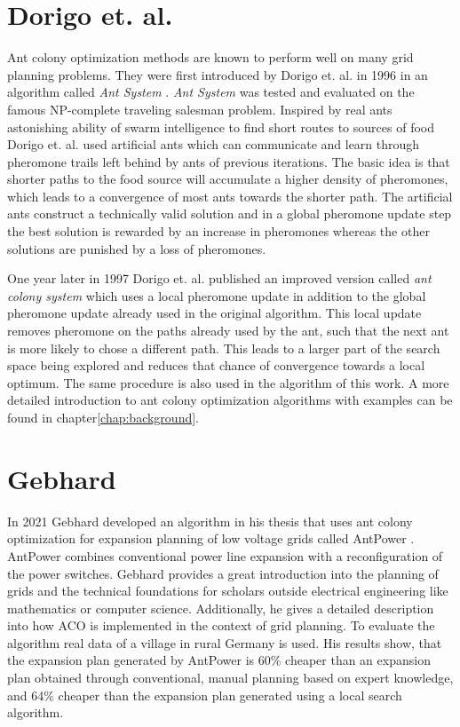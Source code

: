 \section{Dorigo et. al.}
Ant colony optimization methods are known to perform well on many grid planning problems. They were first introduced by Dorigo et. al. in 1996 in an algorithm called \textit{Ant System} \cite{ant_system}. \textit{Ant System} was tested and evaluated on the famous NP-complete traveling salesman problem. Inspired by real ants astonishing ability of swarm intelligence to find short routes to sources of food Dorigo et. al. used artificial ants which can communicate and learn through pheromone trails left behind by ants of previous iterations.
The basic idea is that shorter paths to the food source will accumulate a higher density of pheromones, which leads to a convergence of most ants towards the shorter path. The artificial ants construct a technically valid solution and in a global pheromone update step the best solution is rewarded by an increase in pheromones whereas the other solutions are punished by a loss of pheromones.

One year later in 1997 Dorigo et. al. published an improved version called \textit{ant colony system} \cite{ant_coloy_system} which uses a local pheromone update in addition to the global pheromone update already used in the original algorithm. This local update removes pheromone on the paths already used by the ant, such that the next ant is more likely to chose a different path. This leads to a larger part of the search space being explored and reduces that chance of convergence towards a local optimum. The same procedure is also used in the algorithm of this work. A more detailed introduction to ant colony optimization algorithms with examples can be found in chapter\ref{chap:background}.\\

\section{Gebhard}
In 2021 Gebhard developed an algorithm in his thesis that uses ant colony optimization for expansion planning of low voltage grids called AntPower \cite{gebhard2021expansion}. AntPower combines conventional power line expansion with a reconfiguration of the power switches. Gebhard provides a great introduction into the planning of grids and the technical foundations for scholars outside electrical engineering like mathematics or computer science. Additionally, he gives a detailed description into how ACO is implemented in the context of grid planning. To evaluate the algorithm real data of a village in rural Germany is used. His results show, that the expansion plan generated by AntPower is 60\% cheaper than an expansion plan obtained through conventional, manual planning based on expert knowledge, and 64\% cheaper than the expansion plan generated using a local search algorithm.

